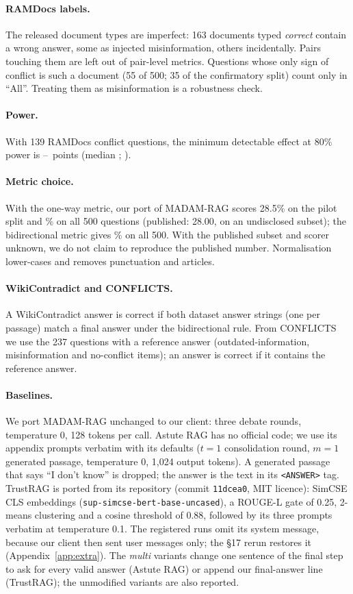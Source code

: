 \paragraph{RAMDocs labels.} The released document types are imperfect: 163 documents typed \emph{correct} contain a
wrong answer, some as injected misinformation, others incidentally. Pairs touching them are left out of pair-level
metrics. Questions whose only sign of conflict is such a document (55 of 500; 35 of the confirmatory split) count
only in ``All''. Treating them as misinformation is a robustness check.

\paragraph{Power.} With 139 RAMDocs conflict questions, the minimum detectable effect at 80\% power is
\mdeLo--\mdeHi\ points (median \mdeMed; \citealp{card2020power}).

\paragraph{Metric choice.} With the one-way metric, our port of MADAM-RAG scores 28.5\% on the pilot split and
\madamOneWay\% on all 500 questions (published: 28.00, on an undisclosed subset); the bidirectional metric gives
\madamBidir\% on all 500. With the published subset and scorer unknown, we do not claim to reproduce the
published number. Normalisation lower-cases and removes punctuation and articles.

\paragraph{WikiContradict and CONFLICTS.} A WikiContradict answer is correct if both dataset answer strings
(one per passage) match a final answer under the bidirectional rule. From CONFLICTS we use the 237 questions with
a reference answer (outdated-information, misinformation and no-conflict items); an answer is correct if it
contains the reference answer.

\paragraph{Baselines.} We port MADAM-RAG unchanged to our client: three debate rounds, temperature 0, 128 tokens
per call. Astute RAG has no official code; we use its appendix prompts verbatim with its defaults
($t{=}1$ consolidation round, $m{=}1$ generated passage, temperature 0, 1,024 output tokens). A generated
passage that says ``I don't know'' is dropped; the answer is the text in its \texttt{<ANSWER>} tag. TrustRAG is
ported from its repository (commit \texttt{11dcea0}, MIT licence): SimCSE CLS embeddings
(\texttt{sup-simcse-bert-base-uncased}), a ROUGE-L gate of 0.25, 2-means clustering and a cosine threshold of 0.88,
followed by its three prompts verbatim at temperature 0.1. The registered runs omit its system message, because our client then sent
user messages only; the \S17 rerun restores it (Appendix~\ref{app:extra}). The \emph{multi} variants change one sentence of the final step to ask for every valid answer
(Astute RAG) or append our final-answer line (TrustRAG); the unmodified variants are also reported.

